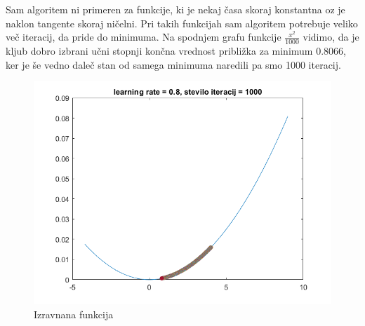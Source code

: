 \documentclass{article}
\begin{document}
\noindent Sam algoritem ni primeren za funkcije, ki je nekaj časa skoraj konstantna oz je naklon tangente skoraj ničelni. Pri takih funkcijah sam algoritem potrebuje veliko več iteracij, da pride do minimuma. Na spodnjem grafu funkcije $\frac{x^2}{1000}$ vidimo, da je kljub dobro izbrani učni stopnji končna vrednost približka za minimum 0.8066, ker je še vedno daleč stan od samega minimuma naredili pa smo 1000 iteracij.


\begin{figure}[h]
\includegraphics[scale=0.6]{izravnana_fun}   
 \caption{Izravnana funkcija}
\label{fig:foobar}
\end{figure}
\end{document}
